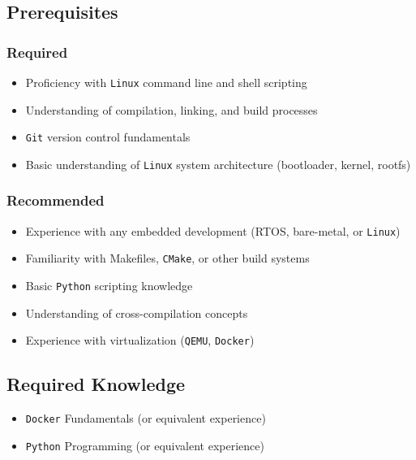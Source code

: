 \documentclass[
]{article}
\providecommand{\tightlist}{%
  \setlength{\itemsep}{0pt}\setlength{\parskip}{0pt}}
\begin{document}
\subsection{Prerequisites}\label{prerequisites}

\subsubsection{Required}\label{required}

\begin{itemize}
\tightlist
\item
  Proficiency with \texttt{Linux} command line and shell scripting
\item
  Understanding of compilation, linking, and build processes
\item
  \texttt{Git} version control fundamentals
\item
  Basic understanding of \texttt{Linux} system architecture (bootloader,
  kernel, rootfs)
\end{itemize}

\subsubsection{Recommended}\label{recommended}

\begin{itemize}
\tightlist
\item
  Experience with any embedded development (RTOS, bare-metal, or
  \texttt{Linux})
\item
  Familiarity with Makefiles, \texttt{CMake}, or other build systems
\item
  Basic \texttt{Python} scripting knowledge
\item
  Understanding of cross-compilation concepts
\item
  Experience with virtualization (\texttt{QEMU}, \texttt{Docker})
\end{itemize}

\subsection{Required Knowledge}\label{required-knowledge}

\begin{itemize}
\tightlist
\item
  \texttt{Docker} Fundamentals (or equivalent experience)
\item
  \texttt{Python} Programming (or equivalent experience)
\end{itemize}
\end{document}
